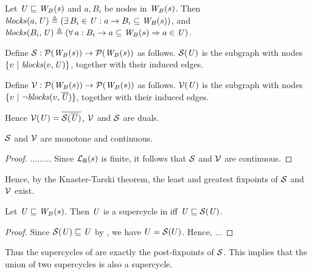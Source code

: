 \begin{definition} \label{defn:blocks}
Let $\mathit{U} \sqsubseteq \mathit{W}_{B}({s})$ and $a, B_i$ be nodes in $\mathit{W}_{B}({s})$. Then 
$\mathit{blocks}(a, \mathit{U}) \triangleq (\exists\, B_i \in \mathit{U} : a \rightarrow B_i \subseteq \mathit{W}_{B}({s}))$, and 
$\mathit{blocks}(B_i, \mathit{U}) \triangleq (\forall\, a : B_i \rightarrow a \subseteq\mathit{W}_{B}({s}) \Rightarrow a \in \mathit{U})$.
\end{definition}

\begin{definition} \label{defn:scFix}
Define $\mathcal{S}: \mathcal{P}(\mathit{W}_{B}({s})) \to \mathcal{P}(\mathit{W}_{B}({s}))$ as follows.
$\mathcal{S}(\mathit{U})$ is the subgraph with nodes $\{ v ~|~ \mathit{blocks}(v, \mathit{U})  \}$, together with their induced edges.
\end{definition}


\begin{definition}\label{defn:violFix}
Define $\mathcal{V}: \mathcal{P}(\mathit{W}_{B}({s})) \to \mathcal{P}(\mathit{W}_{B}({s}))$ as follows.
$\mathcal{V}(\mathit{U})$ is the subgraph with nodes ${\{ v ~|~ \neg \mathit{blocks}(v, \overline{\mathit{\mathit{U}}}) \}}$, together with their induced edges.
\end{definition}
%
Hence $\mathcal{V}(\mathit{U}) = \overline{\mathcal{S}(\overline{\mathit{U}})}$, \ie $\mathcal{V}$ and $\mathcal{S}$ are duals.

\begin{proposition} \label{prop:monotone}
$\mathcal{S}$ and $\mathcal{V}$ are monotone and continuous.
\end{proposition}
%
\begin{proof}
.........
Since $\mathcal{L}_{\mathsf{B}}({s})$ is finite, it follows that $\mathcal{S}$ and $\mathcal{V}$ are continuous.
\end{proof}

Hence, by the Knaster-Tarski theorem, the least and greatest fixpoints of $\mathcal{S}$ and $\mathcal{V}$ exist.

\begin{proposition} \label{prop:supercycleGFP}
Let $\mathit{U} \sqsubseteq \mathit{W}_{B}({s})$. Then $\mathit{U}$ is a supercycle in  iff $\mathit{U} \sqsubseteq \mathcal{S}(\mathit{U})$.
\end{proposition}
%
\begin{proof}
Since $\mathcal{S}(\mathit{U}) \sqsubseteq \mathit{U}$ by , we have $U = \mathcal{S}(U)$. Hence, ...
\end{proof}

Thus the supercycles of  are exactly the post-fixpoints of $\mathcal{S}$. This implies that the union of two supercycles is also a supercycle. 


